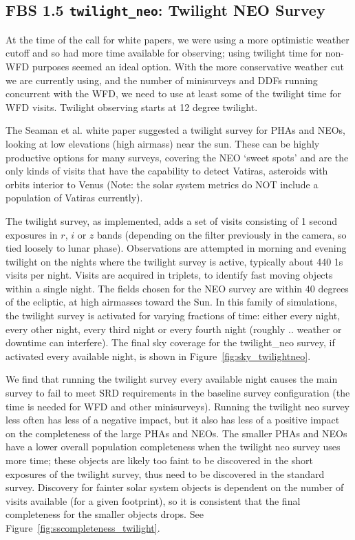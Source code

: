 \subsection{FBS 1.5 {\tt twilight\_neo}: Twilight NEO Survey}\label{ss:twilightneo}

At the time of the call for white papers, we were using a more optimistic weather cutoff and so had more time available for observing; using twilight time for non-WFD purposes seemed an ideal option. With the more conservative weather cut we are currently using, and the number of minisurveys and DDFs running concurrent with the WFD, we need to use at least some of the twilight time for WFD visits. Twilight observing starts at 12 degree twilight. 

The Seaman et al. white paper suggested a twilight survey for PHAs and NEOs, looking at low elevations (high airmass) near the sun. These can be highly productive options for many surveys, covering the NEO `sweet spots' and are the only kinds of visits that have the capability to detect Vatiras, asteroids with orbits interior to Venus (Note: the solar system metrics do NOT include a population of Vatiras currently). 

The twilight survey, as implemented, adds a set of visits consisting of 1 second exposures in $r$, $i$ or $z$ bands (depending on the filter previously in the camera, so tied loosely to lunar phase). Observations are attempted in morning and evening twilight on the nights where the twilight survey is active, typically about 440 1s visits per night. Visits are acquired in triplets, to identify fast moving objects within a single night. The fields chosen for the NEO survey are within 40 degrees of the ecliptic, at high airmasses toward the Sun. In this family of simulations, the twilight survey is activated for varying fractions of time: either every night, every other night, every third night or every fourth night (roughly .. weather or downtime can interfere). The final sky coverage for the twilight\_neo survey, if activated every available night, is shown in Figure~\ref{fig:sky_twilightneo}. 

We find that running the twilight survey every available night causes the main survey to fail to meet SRD requirements in the baseline survey configuration (the time is needed for WFD and other minisurveys). Running the twilight neo survey less often has less of a negative impact, but it also has less of a positive impact on the completeness of the large PHAs and NEOs. The smaller PHAs and NEOs have a lower overall population completeness when the twilight neo survey uses more time; these objects are likely too faint to be discovered in the short exposures of the twilight survey, thus need to be discovered in the standard survey. Discovery for fainter solar system objects is dependent on the number of visits available (for a given footprint), so it is consistent that the final completeness for the smaller objects drops. See Figure~\ref{fig:sscompleteness_twilight}. 


